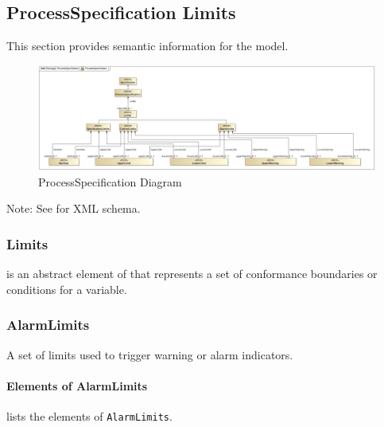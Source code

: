 \subsection{ProcessSpecification Limits} \label{sec:ProcessSpecification Limits}


This section provides semantic information for the  model.

\begin{figure}[ht]
  \centering
    \includegraphics[width=1.0\textwidth]{figures/ProcessSpecification.png}
  \caption{ProcessSpecification Diagram}
  \label{fig:ProcessSpecification Diagram}
\end{figure}

\FloatBarrier


Note: See  for XML schema.


\subsubsection{Limits}
\label{sec:Limits}



 is an abstract element of  that represents a set of conformance boundaries or conditions for a variable.



\subsubsection{AlarmLimits}
\label{sec:AlarmLimits}



A set of limits used to trigger warning or alarm indicators.


\paragraph{Elements of AlarmLimits}\mbox{}
\label{sec:Elements of AlarmLimits}

 lists the elements of \texttt{AlarmLimits}.

